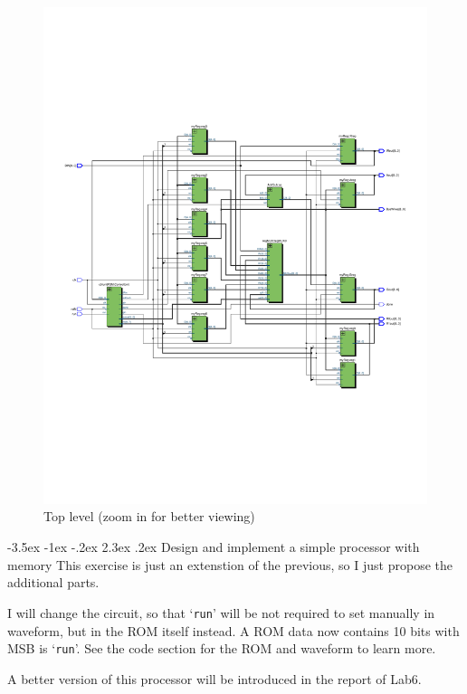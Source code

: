 \documentclass[13pt,a4paper]{report}
\makeatletter
\renewcommand\section{\@startsection {section}{1}{-1em}%
  {-3.5ex \@plus -1ex \@minus -.2ex}%
  {2.3ex \@plus.2ex}%
  {\normalfont\Large\bfseries}}
\makeatother
\begin{document}
\begin{figure}[H]
\centering
\includegraphics[scale=0.85, clip, trim={0cm 6.5cm 0cm 6.5cm}]{images/Exc1_RTL.pdf}
\caption*{Top level (zoom in for better viewing)}
\end{figure}

\newpage
\section{Design and implement a simple processor with memory}
This exercise is just an extenstion of the previous, so I just propose the additional parts.

I will change the circuit, so that `\texttt{run}' will be not required to set manually in waveform, but in the ROM itself instead. A ROM data now contains 10 bits with MSB is `\texttt{run}'. See the code section for the ROM and waveform to learn more.

A better version of this processor will be introduced in the report of Lab6.
 
\end{document}
